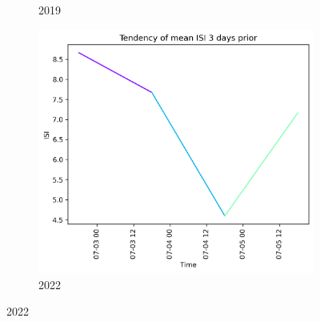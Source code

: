 \begin{figure}[h]
\begin{subfigure}{0.3\textwidth}
		\caption{2019}
		\label{fig:isi_prior_3_days_2019}
	\end{subfigure}
	\hfill
	\begin{subfigure}{0.3\textwidth}
		\centering
		\includegraphics[width=\textwidth]{graphs/3days/2022_3daysprior_tendency_graph_ISI.png}
		\caption{2022}
		\label{fig:isi_prior_3_days_2022}
	\end{subfigure}
	
	\label{fig:isi_values_3days_prior}
\end{figure}

